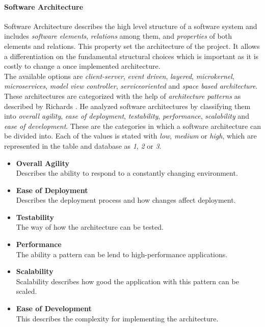 \paragraph*{\textbf{Software Architecture}}
Software Architecture describes the high level structure of a software system and includes \textit{software elements}, \textit{relations} among them, and \textit{properties} of both elements and relations. This property set the architecture of the project. It allows a differentiation on the fundamental structural choices which is important as it is costly to change a once implemented architecture.\\
The available options are \textit{client-server}, \textit{event driven}, \textit{layered}, \textit{microkernel}, \textit{microservices}, \textit{model view controller}, \textit{serviceoriented} and \textit{space based architecture}. These architectures are categorized with the help of \textit{architecture patterns} as described by Richards \cite{archpatterns}. He analyzed software architectures by classifying them into \textit{overall agility}, \textit{ease of deployment}, \textit{testability}, \textit{performance}, \textit{scalability} and \textit{ease of development}. These are the categories in which a software architecture can be divided into. Each of the values is stated with \textit{low}, \textit{medium} or \textit{high}, which are represented in the table and database as \textit{1}, \textit{2} or \textit{3}.\\
\begin{itemize}
	\item \textbf{Overall Agility}\\Describes the ability to respond to a constantly changing environment.
	\item \textbf{Ease of Deployment}\\Describes the deployment process and how changes affect deployment.
	\item \textbf{Testability}\\The way of how the architecture can be tested.
	\item \textbf{Performance}\\The ability a pattern can be lend to high-performance applications.
	\item \textbf{Scalability}\\Scalability describes how good the application with this pattern can be scaled.
	\item \textbf{Ease of Development}\\This describes the complexity for implementing the architecture.\\
\end{itemize}
